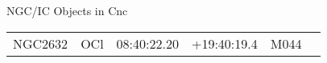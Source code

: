\begin{block}{NGC/IC Objects in Cnc}
  \centering
  \begin{tabularx}{\textwidth}{llrrll} 
    NGC2632 & OCl & 08:40:22.20 & +19:40:19.4  & M044 \\ 
  \end{tabularx}
\end{block}